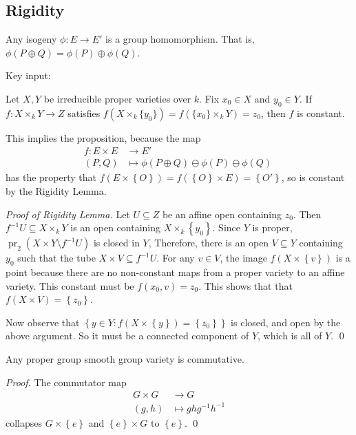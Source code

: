 \subsection{Rigidity}
\begin{proposition}
  Any isogeny \( \phi \colon E\to E' \) is a group homomorphism. That is, \( \phi \left( P \oplus Q \right) = \phi \left( P \right) \oplus \phi \left( Q \right) \).
\end{proposition}
Key input:
\begin{lemma}[Rigidity]
  Let \( X,Y \) be irreducible proper varieties over \( k \).
  Fix \( x_0 \in X \) and \( y_0 \in Y \).
  If \( f \colon X \times_k Y \to Z \) satisfies \( f \left( X \times_k \lbrace y_0 \rbrace \right) = f \left( \lbrace x_0 \rbrace \times_k Y \right) = z_0 \), then \( f \) is constant.
\end{lemma}
This implies the proposition, because the map
\begin{align*}
  f \colon E \times E & \to E' \\
  (P,Q) & \mapsto  \phi( P \oplus Q ) \ominus \phi(P) \ominus \phi(Q)\
\end{align*}
has the property that \( f(E \times \left\lbrace O \right\rbrace) = f( \left\lbrace O \right\rbrace \times E ) = \left\lbrace O' \right\rbrace \), so is constant by the Rigidity Lemma.

\textit{Proof of Rigidity Lemma.}
Let \( U \subseteq Z \) be an affine open containing \( z_0 \).
Then \( f^{-1}U \subseteq X \times_k Y \) is an open containing \( X \times_k \left\lbrace y_0 \right\rbrace \).
Since \( Y \) is proper, \( \operatorname{pr}_2 \left( X \times Y \setminus f^{-1} U \right) \) is closed in \( Y \),
Therefore, there is an open \( V \subseteq Y \) containing \( y_0 \) such that the tube \( X \times V \subseteq f^{-1} U \).
For any \( v \in V \), the image \( f(X \times \left\lbrace v \right\rbrace ) \) is a point because there are no non-constant maps from a proper variety to an affine variety.
This constant must be \( f( x_0, v) = z_0 \).
This shows that that \( f(X \times V) = \left\lbrace z_0 \right\rbrace \).

Now observe that \( \left\lbrace y \in Y : f(X \times \left\lbrace y \right\rbrace ) = \left\lbrace z_0 \right\rbrace \right\rbrace \) is closed, and open by the above argument. So it must be a connected component of \( Y \), which is all of \( Y \). \qed

\begin{corollary}
  Any proper group smooth group variety is commutative.
\end{corollary}
\textit{Proof.}
The commutator map
\begin{align*}
  G \times G & \to G \\
  (g,h) & \mapsto ghg^{-1}h^{-1}
\end{align*}
collapses \( G \times \left\lbrace e \right\rbrace \) and \( \left\lbrace e \right\rbrace \times G \) to \( \left\lbrace e \right\rbrace \). \qed

